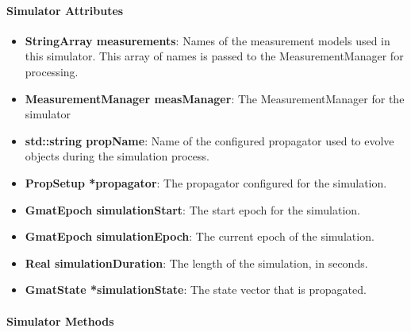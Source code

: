 \paragraph{Simulator Attributes}

\begin{itemize}
\item \textbf{StringArray measurements}:  Names of the measurement models used in this simulator.
This array of names is passed to the MeasurementManager for processing.
\item \textbf{MeasurementManager measManager}:  The MeasurementManager for the simulator
\item \textbf{std::string propName}:  Name of the configured propagator used to evolve objects
during the simulation process.
\item \textbf{PropSetup *propagator}:  The propagator configured for the simulation.
\item \textbf{GmatEpoch simulationStart}:  The start epoch for the simulation.
\item \textbf{GmatEpoch simulationEpoch}:  The current epoch of the simulation.
\item \textbf{Real simulationDuration}:  The length of the simulation, in seconds.
\item \textbf{GmatState *simulationState}:  The state vector that is propagated.
\end{itemize}

\paragraph{Simulator Methods}

